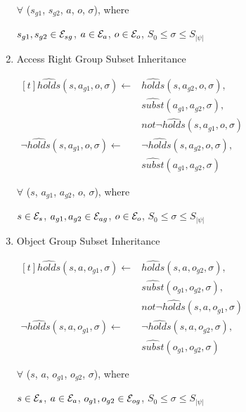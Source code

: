 \documentclass[10pt, twocolumn]{article}
\begin{document}
\begin{enumerate}
                $\forall$ ($s_{g1}$, $s_{g2}$, $a$, $o$, $\sigma$), where

                $s_{g1}, s_{g2} \in {\cal E}_{sg}$,
                $a \in {\cal E}_{a}$,
                $o \in {\cal E}_{o}$,
                $S_{0} \leq \sigma \leq S_{|\psi|}$

              \item
                Access Right Group Subset Inheritance

                \begin{math}
                  \begin{aligned}[t]
                    \hat{holds}(s, a_{g1}, o, \sigma) \leftarrow &
                    \hat{holds}(s, a_{g2}, o, \sigma), \\
                    & \hat{subst}(a_{g1}, a_{g2}, \sigma), \\
                    & not \lnot \hat{holds}(s, a_{g1}, o, \sigma) \\
                    \lnot \hat{holds}(s, a_{g1}, o, \sigma) \leftarrow &
                    \lnot \hat{holds}(s, a_{g2}, o, \sigma), \\
                    & \hat{subst}(a_{g1}, a_{g2}, \sigma)
                  \end{aligned}
                \end{math}

                $\forall$ ($s$, $a_{g1}$, $a_{g2}$, $o$, $\sigma$), where

                $s \in {\cal E}_{s}$,
                $a_{g1}, a_{g2} \in {\cal E}_{ag}$,
                $o \in {\cal E}_{o}$,
                $S_{0} \leq \sigma \leq S_{|\psi|}$

              \item
                Object Group Subset Inheritance

                \begin{math}
                  \begin{aligned}[t]
                    \hat{holds}(s, a, o_{g1}, \sigma) \leftarrow &
                    \hat{holds}(s, a, o_{g2}, \sigma), \\
                    & \hat{subst}(o_{g1}, o_{g2}, \sigma), \\
                    & not \lnot \hat{holds}(s, a, o_{g1}, \sigma) \\
                    \lnot \hat{holds}(s, a, o_{g1}, \sigma) \leftarrow &
                    \lnot \hat{holds}(s, a, o_{g2}, \sigma), \\
                    & \hat{subst}(o_{g1}, o_{g2}, \sigma)
                  \end{aligned}
                \end{math}

                $\forall$ ($s$, $a$, $o_{g1}$, $o_{g2}$, $\sigma$), where

                $s \in {\cal E}_{s}$,
                $a \in {\cal E}_{a}$,
                $o_{g1}, o_{g2} \in {\cal E}_{og}$,
                $S_{0} \leq \sigma \leq S_{|\psi|}$
            \end{enumerate}
\end{document}
